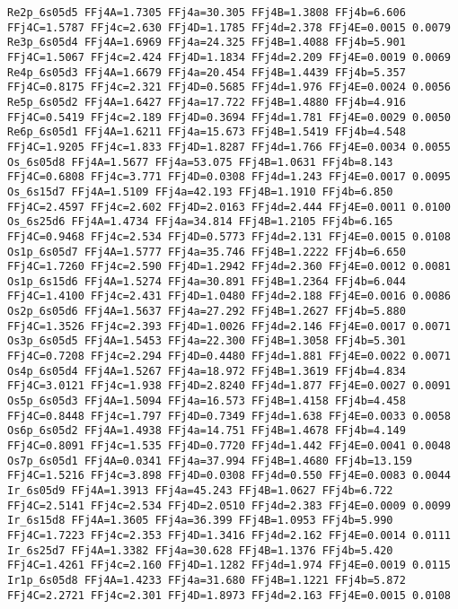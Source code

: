 {\begin{verbatim}
Re2p_6s05d5 FFj4A=1.7305 FFj4a=30.305 FFj4B=1.3808 FFj4b=6.606 FFj4C=1.5787 FFj4c=2.630 FFj4D=1.1785 FFj4d=2.378 FFj4E=0.0015 0.0079 
Re3p_6s05d4 FFj4A=1.6969 FFj4a=24.325 FFj4B=1.4088 FFj4b=5.901 FFj4C=1.5067 FFj4c=2.424 FFj4D=1.1834 FFj4d=2.209 FFj4E=0.0019 0.0069 
Re4p_6s05d3 FFj4A=1.6679 FFj4a=20.454 FFj4B=1.4439 FFj4b=5.357 FFj4C=0.8175 FFj4c=2.321 FFj4D=0.5685 FFj4d=1.976 FFj4E=0.0024 0.0056 
Re5p_6s05d2 FFj4A=1.6427 FFj4a=17.722 FFj4B=1.4880 FFj4b=4.916 FFj4C=0.5419 FFj4c=2.189 FFj4D=0.3694 FFj4d=1.781 FFj4E=0.0029 0.0050 
Re6p_6s05d1 FFj4A=1.6211 FFj4a=15.673 FFj4B=1.5419 FFj4b=4.548 FFj4C=1.9205 FFj4c=1.833 FFj4D=1.8287 FFj4d=1.766 FFj4E=0.0034 0.0055 
Os_6s05d8 FFj4A=1.5677 FFj4a=53.075 FFj4B=1.0631 FFj4b=8.143 FFj4C=0.6808 FFj4c=3.771 FFj4D=0.0308 FFj4d=1.243 FFj4E=0.0017 0.0095 
Os_6s15d7 FFj4A=1.5109 FFj4a=42.193 FFj4B=1.1910 FFj4b=6.850 FFj4C=2.4597 FFj4c=2.602 FFj4D=2.0163 FFj4d=2.444 FFj4E=0.0011 0.0100 
Os_6s25d6 FFj4A=1.4734 FFj4a=34.814 FFj4B=1.2105 FFj4b=6.165 FFj4C=0.9468 FFj4c=2.534 FFj4D=0.5773 FFj4d=2.131 FFj4E=0.0015 0.0108 
Os1p_6s05d7 FFj4A=1.5777 FFj4a=35.746 FFj4B=1.2222 FFj4b=6.650 FFj4C=1.7260 FFj4c=2.590 FFj4D=1.2942 FFj4d=2.360 FFj4E=0.0012 0.0081 
Os1p_6s15d6 FFj4A=1.5274 FFj4a=30.891 FFj4B=1.2364 FFj4b=6.044 FFj4C=1.4100 FFj4c=2.431 FFj4D=1.0480 FFj4d=2.188 FFj4E=0.0016 0.0086 
Os2p_6s05d6 FFj4A=1.5637 FFj4a=27.292 FFj4B=1.2627 FFj4b=5.880 FFj4C=1.3526 FFj4c=2.393 FFj4D=1.0026 FFj4d=2.146 FFj4E=0.0017 0.0071 
Os3p_6s05d5 FFj4A=1.5453 FFj4a=22.300 FFj4B=1.3058 FFj4b=5.301 FFj4C=0.7208 FFj4c=2.294 FFj4D=0.4480 FFj4d=1.881 FFj4E=0.0022 0.0071 
Os4p_6s05d4 FFj4A=1.5267 FFj4a=18.972 FFj4B=1.3619 FFj4b=4.834 FFj4C=3.0121 FFj4c=1.938 FFj4D=2.8240 FFj4d=1.877 FFj4E=0.0027 0.0091 
Os5p_6s05d3 FFj4A=1.5094 FFj4a=16.573 FFj4B=1.4158 FFj4b=4.458 FFj4C=0.8448 FFj4c=1.797 FFj4D=0.7349 FFj4d=1.638 FFj4E=0.0033 0.0058 
Os6p_6s05d2 FFj4A=1.4938 FFj4a=14.751 FFj4B=1.4678 FFj4b=4.149 FFj4C=0.8091 FFj4c=1.535 FFj4D=0.7720 FFj4d=1.442 FFj4E=0.0041 0.0048 
Os7p_6s05d1 FFj4A=0.0341 FFj4a=37.994 FFj4B=1.4680 FFj4b=13.159 FFj4C=1.5216 FFj4c=3.898 FFj4D=0.0308 FFj4d=0.550 FFj4E=0.0083 0.0044 
Ir_6s05d9 FFj4A=1.3913 FFj4a=45.243 FFj4B=1.0627 FFj4b=6.722 FFj4C=2.5141 FFj4c=2.534 FFj4D=2.0510 FFj4d=2.383 FFj4E=0.0009 0.0099 
Ir_6s15d8 FFj4A=1.3605 FFj4a=36.399 FFj4B=1.0953 FFj4b=5.990 FFj4C=1.7223 FFj4c=2.353 FFj4D=1.3416 FFj4d=2.162 FFj4E=0.0014 0.0111 
Ir_6s25d7 FFj4A=1.3382 FFj4a=30.628 FFj4B=1.1376 FFj4b=5.420 FFj4C=1.4261 FFj4c=2.160 FFj4D=1.1282 FFj4d=1.974 FFj4E=0.0019 0.0115 
Ir1p_6s05d8 FFj4A=1.4233 FFj4a=31.680 FFj4B=1.1221 FFj4b=5.872 FFj4C=2.2721 FFj4c=2.301 FFj4D=1.8973 FFj4d=2.163 FFj4E=0.0015 0.0108 

\end{verbatim}}
